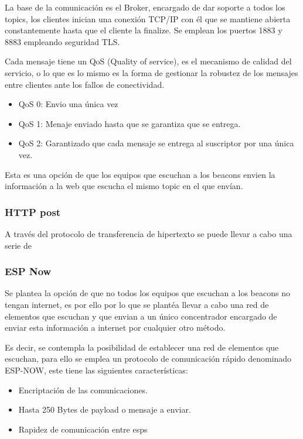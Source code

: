 \documentclass[a4paper ,12pt, onecolumn]{article}
\begin{document}
\begin{enumerate}
                La base de la comunicación es el Broker, encargado de dar soporte a todos los topics, los clientes inician una 
                conexión TCP/IP con él que se mantiene abierta constantemente hasta que el cliente la finalize. Se emplean los puertos
                1883 y 8883 empleando seguridad TLS.

                Cada mensaje tiene un QoS (Quality of service), es el mecanismo de calidad del servicio, o lo que es lo mismo es la forma de
                gestionar la robustez de los mensajes entre clientes ante los fallos de conectividad.
                \begin{itemize}
                    \item QoS 0: Envio una única vez
                    \item QoS 1: Menaje enviado hasta que se garantiza que se entrega.
                    \item QoS 2: Garantizado que cada mensaje se entrega al suscriptor por una única vez.
                \end{itemize}

                Esta es una opción de que los equipos que escuchan a los beacons envien la información a la web que escucha el mismo
                topic en el que envían.
            \subsubsection {HTTP post}
                A través del protocolo de transferencia de hipertexto se puede llevar a cabo una serie de  
            \subsubsection {ESP Now}
                Se plantea la opción de que no todos los equipos que escuchan a los beacons no tengan internet, es por ello por lo 
                que se plantéa llevar a cabo una red de elementos que escuchan y que envian a un único concentrador encargado de enviar
                esta información a internet por cualquier otro método.

                Es decir, se contempla la posibilidad de establecer una red de elementos que escuchan, para ello se emplea 
                un protocolo de comunicación rápido denominado ESP-NOW, este tiene las siguientes características:
                \begin{itemize}
                    \item Encriptación de las comunicaciones.
                    \item Hasta 250 Bytes de payload o mensaje a enviar.
                    \item Rapidez de comunicación entre esps
                \end{itemize}

\end{enumerate}
\end{document}
